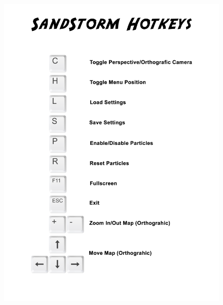 \begin{Spacing}{\mylinespace}
	\newpage
	\setcounter{page}{3}
	\begin{figure}[h!]
		\centering
		\vspace*{0px}
		\includegraphics[width=\columnwidth]{graphics/Hotkeys.png}
	\end{figure}
	
\end{Spacing}
\newpage
\clearpage
